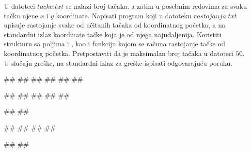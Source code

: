 \begin{Exercise}[label=p3_07] 
 U datoteci $tacke.txt$ se nalazi broj tačaka, a zatim u posebnim redovima  
 za svaku tačku njene $x$ i $y$ koordinate. 
 Napisati program koji u datoteku $rastojanja.txt$ upisuje rastojanje svake 
 od učitanih tačaka od koordinatnog početka, 
 a na standardni izlaz koordinate tačke koja je od njega najudaljenija. 
 Koristiti strukturu  sa poljima  i , 
 kao i funkciju kojom se računa rastojanje tačke od koordinatnog početka. 
 Pretpostaviti da je maksimalan broj tačaka u datoteci $50$.
 U slučaju greške, na standardni izlaz za greške ispisati odgovarajuću poruku.

\begin{miditest}
\begin{upotreba}{1}
##
##
##
##
##
##

##
##
##
##
##

#\naslovIzlaz#
##
\end{upotreba}
\end{miditest}
\begin{miditest}
\begin{upotreba}{2}
##
##
##
##

#\naslovIzlazZaGresku#
##
\end{upotreba}
\end{miditest}
\end{Exercise}
\begin{Answer}[ref=p3_07]
\end{Answer}


